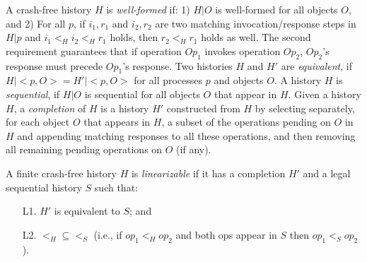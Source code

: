 A crash-free history $H$ is \emph{well-formed} if: 1) $H | O$ is well-formed for all objects $O$, and 2) For all $p$, if $i_1,r_1$ and $i_2,r_2$ are two matching invocation/response steps in $H | p$ and $i_1 <_H i_2 <_H r_1$ holds, then $r_2 <_H r_1$ holds as well. The second requirement guarantees that if operation $Op_1$ invokes operation $Op_2$, $Op_2$'s response must precede $Op_1$'s response.
%
%
Two histories $H$ and $H'$ are \emph{equivalent}, if $H|{<}p,O{>}=H'|{<}p,O{>}$ for all processes $p$ and objects $O$. A history $H$ is \textit{sequential}, if $H | O$ is sequential for all objects $O$ that appear in $H$.
Given a history $H$, a \textit{completion} of $H$ is a history $H'$ constructed from $H$ by selecting separately, for each object $O$ that appears in $H$, a subset of the operations pending on $O$ in $H$ and appending matching responses to all these operations, and then removing all remaining pending operations on $O$ (if any).

\begin{definition} 
	\label{Definition: Linearizability}
A finite crash-free history $H$ is \emph{linearizable} if it has a completion $H'$ and a legal sequential history $S$ such that:
	\begin{enumerate}
		\item [L1.] $H'$ is equivalent to $S$; and
		\item [L2.] $<_H \subseteq <_S$ (i.e., if $op_1 <_H op_2$ and both ops appear in $S$ then $op_1 <_S op_2$).
	\end{enumerate}
\end{definition}

